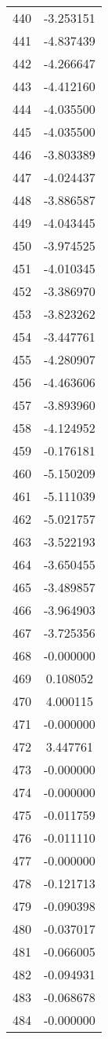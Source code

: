 \documentclass[12pt]{article}
\begin{document}
\begin{longtable}{@{}cc@{}}
440 & -3.253151 \\
441 & -4.837439 \\
442 & -4.266647 \\
443 & -4.412160 \\
444 & -4.035500 \\
445 & -4.035500 \\
446 & -3.803389 \\
447 & -4.024437 \\
448 & -3.886587 \\
449 & -4.043445 \\
450 & -3.974525 \\
451 & -4.010345 \\
452 & -3.386970 \\
453 & -3.823262 \\
454 & -3.447761 \\
455 & -4.280907 \\
456 & -4.463606 \\
457 & -3.893960 \\
458 & -4.124952 \\
459 & -0.176181 \\
460 & -5.150209 \\
461 & -5.111039 \\
462 & -5.021757 \\
463 & -3.522193 \\
464 & -3.650455 \\
465 & -3.489857 \\
466 & -3.964903 \\
467 & -3.725356 \\
468 & -0.000000 \\
469 & 0.108052 \\
470 & 4.000115 \\
471 & -0.000000 \\
472 & 3.447761 \\
473 & -0.000000 \\
474 & -0.000000 \\
475 & -0.011759 \\
476 & -0.011110 \\
477 & -0.000000 \\
478 & -0.121713 \\
479 & -0.090398 \\
480 & -0.037017 \\
481 & -0.066005 \\
482 & -0.094931 \\
483 & -0.068678 \\
484 & -0.000000 \\

\end{longtable}
\end{document}
